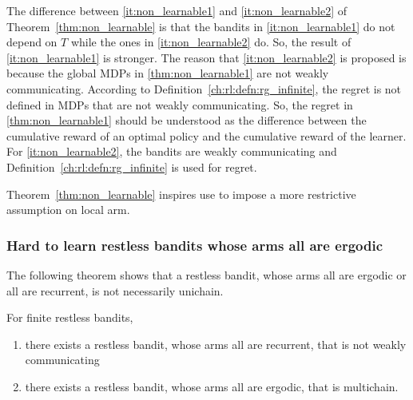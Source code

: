 The difference between \ref{it:non_learnable1} and \ref{it:non_learnable2} of Theorem~\ref{thm:non_learnable} is that the bandits in \ref{it:non_learnable1} do not depend on $T$ while the ones in \ref{it:non_learnable2} do.
So, the result of \ref{it:non_learnable1} is stronger.
The reason that \ref{it:non_learnable2} is proposed is because the global MDPs in \ref{thm:non_learnable1} are not weakly communicating.
According to Definition~\ref{ch:rl:defn:rg_infinite}, the regret is not defined in MDPs that are not weakly communicating.
So, the regret in \ref{thm:non_learnable1} should be understood as the difference between the cumulative reward of an optimal policy and the cumulative reward of the learner. 
For \ref{it:non_learnable2}, the bandits are weakly communicating and Definition~\ref{ch:rl:defn:rg_infinite} is used for regret.

Theorem~\ref{thm:non_learnable} inspires use to impose a more restrictive assumption on local arm.

\subsubsection{Hard to learn restless bandits whose arms all are ergodic}

The following theorem shows that a restless bandit, whose arms all are ergodic or all are recurrent, is not necessarily unichain.

\begin{thm}
    \label{thm:multichain}
    For finite restless bandits,
    \begin{enumerate}[label=(\roman*)]
        \item \label{thm:not_ergodic} there exists a restless bandit, whose arms all are recurrent, that is not weakly communicating %
        \item \label{thm:ergodic_arms_multichain_RB} there exists a restless bandit, whose arms all are ergodic, that is multichain.
    \end{enumerate}
\end{thm}


